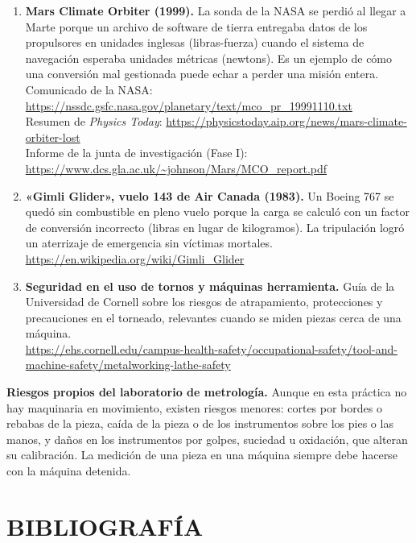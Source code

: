 \documentclass[12pt,a4paper]{article}
\begin{document}
\begin{enumerate}[label=\textbf{\arabic*.}]
	\item \textbf{Mars Climate Orbiter (1999).} La sonda de la NASA se perdió al
	      llegar a Marte porque un archivo de software de tierra entregaba datos
	      de los
	      propulsores en unidades inglesas (libras-fuerza) cuando el sistema de
	      navegación
	      esperaba unidades métricas (newtons). Es un ejemplo de cómo una
	      conversión mal
	      gestionada puede echar a perder una misión entera. \\
	      Comunicado de la NASA:
	      \url{https://nssdc.gsfc.nasa.gov/planetary/text/mco_pr_19991110.txt} \\
	      Resumen de \emph{Physics Today}:
	      \url{https://physicstoday.aip.org/news/mars-climate-orbiter-lost} \\
	      Informe de la junta de investigación (Fase I):
	      \url{https://www.dcs.gla.ac.uk/~johnson/Mars/MCO_report.pdf}
	\item \textbf{«Gimli Glider», vuelo 143 de Air Canada (1983).} Un Boeing 767
	      se quedó sin combustible en pleno vuelo porque la carga se calculó con
	      un factor
	      de conversión incorrecto (libras en lugar de kilogramos). La tripulación
	      logró
	      un aterrizaje de emergencia sin víctimas mortales. \\
	      \url{https://en.wikipedia.org/wiki/Gimli_Glider}
	\item \textbf{Seguridad en el uso de tornos y máquinas herramienta.} Guía de
	      la Universidad de Cornell sobre los riesgos de atrapamiento,
	      protecciones y
	      precauciones en el torneado, relevantes cuando se miden piezas cerca de
	      una
	      máquina. \\
	      \url{https://ehs.cornell.edu/campus-health-safety/occupational-safety/tool-and-machine-safety/metalworking-lathe-safety}
\end{enumerate}

\textbf{Riesgos propios del laboratorio de metrología.} Aunque en esta práctica
no hay maquinaria en movimiento, existen riesgos menores: cortes por bordes o
rebabas de la pieza, caída de la pieza o de los instrumentos sobre los pies o
las manos, y daños en los instrumentos por golpes, suciedad u oxidación, que
alteran su calibración. La medición de una pieza en una máquina siempre debe
hacerse con la máquina detenida.

\section{BIBLIOGRAFÍA}
\end{document}
